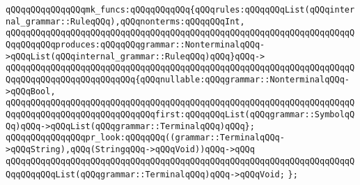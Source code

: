 \newline
\verb|qQQqqQQqqQQqqQQqmk_funcs:qQQqqQQqqQQq{qQQqrules:qQQqqQQqList(qQQqinternal_grammar::RuleqQQq),qQQqnonterms:qQQqqQQqInt,|\newline
\verb|qQQqqQQqqQQqqQQqqQQqqQQqqQQqqQQqqQQqqQQqqQQqqQQqqQQqqQQqqQQqqQQqqQQqqQQqqQQqqQQqproduces:qQQqqQQqgrammar::NonterminalqQQq->qQQqList(qQQqinternal_grammar::RuleqQQq)qQQq}qQQq->|\newline
\verb|qQQqqQQqqQQqqQQqqQQqqQQqqQQqqQQqqQQqqQQqqQQqqQQqqQQqqQQqqQQqqQQqqQQqqQQqqQQqqQQqqQQqqQQqqQQqqQQq{qQQqnullable:qQQqgrammar::NonterminalqQQq->qQQqBool,|\newline
\verb|qQQqqQQqqQQqqQQqqQQqqQQqqQQqqQQqqQQqqQQqqQQqqQQqqQQqqQQqqQQqqQQqqQQqqQQqqQQqqQQqqQQqqQQqqQQqqQQqqQQqfirst:qQQqqQQqList(qQQqgrammar::SymbolqQQq)qQQq->qQQqList(qQQqgrammar::TerminalqQQq)qQQq};|\newline
\newline
\verb|qQQqqQQqqQQqqQQqpr_look:qQQqqQQq((grammar::TerminalqQQq->qQQqString),qQQq(StringqQQq->qQQqVoid))qQQq->qQQq|\newline
\verb|qQQqqQQqqQQqqQQqqQQqqQQqqQQqqQQqqQQqqQQqqQQqqQQqqQQqqQQqqQQqqQQqqQQqqQQqqQQqqQQqList(qQQqgrammar::TerminalqQQq)qQQq->qQQqVoid;|\newline
\verb|};|\newline
\newline

